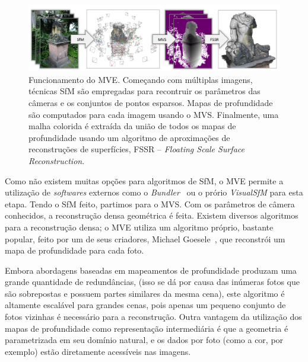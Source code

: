 \begin{figure}[!h]
	\centering
	\includegraphics[width=\linewidth]{figs/mvepipe.png}
	\caption{%
  Funcionamento do MVE. Começando com múltiplas imagens, técnicas SfM são
  empregadas para recontruir os parâmetros das câmeras e os conjuntos de pontos
  esparsos. Mapas de profundidade são computados para cada imagem usando o MVS.
  Finalmente, uma malha colorida é extraída da união de todos os mapas de
  profundidade usando um algoritmo de aproximações de reconstruções de
  superfícies, FSSR -- \emph{Floating Scale Surface Reconstruction}.
	\protect\cite{mve}
	}\label{fig:mvepipeline}
\end{figure}

Como não existem muitas opções para algoritmos de SfM, o MVE permite a
utilização de \emph{softwares} externos como o
\emph{Bundler}~\cite{snavely2010bundler} ou o prório \emph{VisualSfM} para esta
etapa.  Tendo o SfM feito, partimos para o MVS. Com os parâmetros
de câmera conhecidos, a reconstrução densa geométrica é feita. Existem diversos
algoritmos para a reconstrução densa; o MVE utiliza um algoritmo
próprio, bastante popular, feito por um de seus criadores, Michael
Goesele~\cite{goesele2007multi}, que reconstrói um mapa de profundidade para
cada foto. 

Embora abordagens baseadas em mapeamentos de profundidade produzam uma grande
quantidade de redundâncias, (isso se dá por causa das inúmeras fotos que são
sobrepostas e possuem partes similares da mesma cena), este algoritmo é
altamente escalável para grandes cenas, pois apenas um pequeno conjunto de fotos
vizinhas é necessário para a reconstrução. Outra vantagem da utilização dos
mapas de profundidade como representação intermediária é que a geometria é
parametrizada em seu domínio natural, e os dados por foto (como a cor, por
exemplo) estão diretamente acessíveis nas imagens.


